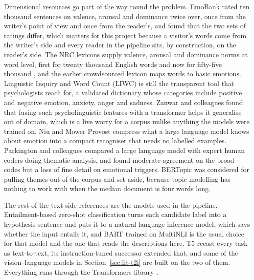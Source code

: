 Dimensional resources go part of the way round the problem. EmoBank \cite{buechel2017emobank} rated ten thousand sentences on valence, arousal and dominance twice over, once from the writer's point of view and once from the reader's, and found that the two sets of ratings differ, which matters for this project because a visitor's words come from the writer's side and every reader in the pipeline sits, by construction, on the reader's side. The NRC lexicons supply valence, arousal and dominance norms at word level, first for twenty thousand English words \cite{mohammad2018obtaining} and now for fifty-five thousand \cite{mohammad2025nrc}, and the earlier crowdsourced lexicon \cite{mohammad2013crowdsourcing} maps words to basic emotions. Linguistic Inquiry and Word Count (LIWC) \cite{tausczik2010psychological} is still the transparent tool that psychologists reach for, a validated dictionary whose categories include positive and negative emotion, anxiety, anger and sadness. Zanwar and colleagues \cite{zanwar2022improving} found that fusing such psycholinguistic features with a transformer helps it generalise out of domain, which is a live worry for a corpus unlike anything the models were trained on. Niu and Mower Provost \cite{niu2025contrastive} compress what a large language model knows about emotion into a compact recogniser that needs no labelled examples. Parkington and colleagues \cite{parkington2025human} compared a large language model with expert human coders doing thematic analysis, and found moderate agreement on the broad codes but a loss of fine detail on emotional triggers. BERTopic \cite{grootendorst2022bertopic} was considered for pulling themes out of the corpus and set aside, because topic modelling has nothing to work with when the median document is four words long.

The rest of the text-side references are the models used in the pipeline. Entailment-based zero-shot classification \cite{yin2019benchmarking} turns each candidate label into a hypothesis sentence and puts it to a natural-language-inference model, which says whether the input entails it, and BART \cite{lewis2020bart} trained on MultiNLI \cite{williams2018broad} is the usual choice for that model and the one that reads the descriptions here. T5 \cite{raffel2020exploring} recast every task as text-to-text, its instruction-tuned successor \cite{chung2022scaling} extended that, and some of the vision--language models in Section~\ref{sec:lit-t2i} are built on the two of them. Everything runs through the Transformers library \cite{wolf2020transformers}.

